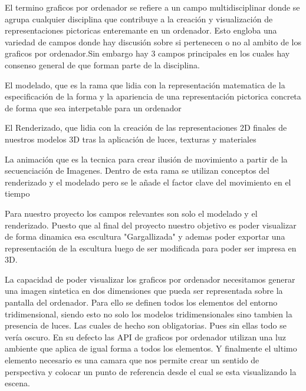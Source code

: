 El termino graficos por ordenador se refiere a un campo multidisciplinar donde se agrupa cualquier disciplina que contribuye a la creación y visualización de representaciones pictoricas enteremante en un ordenador\cite{Foley_1995}.
Esto engloba una variedad de campos donde hay discusión sobre si pertenecen o no al ambito de los graficos por ordenador.Sin embargo hay 3 campos principales en los cuales hay consenso general de que forman parte de la disciplina.
\begin{list}{.}{}
    \item El modelado, que es la rama que lidia con la representación matematica de la especificación de la forma y la apariencia de una representación pictorica concreta de forma que sea interpetable para un ordenador
    \item El Renderizado, que lidia con la creación de las representaciones 2D finales de nuestros modelos 3D tras la aplicación de luces, texturas y materiales 
    \item La animación que es la tecnica para crear ilusión de movimiento a partir de la secuenciación de Imagenes. Dentro de esta rama se utilizan conceptos del renderizado y el modelado pero se le añade el factor clave del movimiento en el tiempo
\end{list} \cite{marschner_fundamentals_2018}

Para nuestro proyecto los campos relevantes son solo el modelado y el renderizado. Puesto que al final del proyecto nuestro objetivo es poder visualizar de forma dinamica esa escultura "Gargallizada" y ademas poder exportar una representación de la escultura luego de ser modificada para poder ser impresa en 3D.

La capacidad de poder visualizar los graficos por ordenador necesitamos generar una imagen sintetica en dos dimensiones que pueda ser representada sobre la pantalla del ordenador. Para ello se definen todos los elementos del entorno tridimensional, siendo esto no solo los modelos tridimensionales sino tambien la presencia de luces. Las cuales de hecho son obligatorias. Pues sin ellas todo se vería oscuro. 
En su defecto las API de graficos por ordenador utilizan una luz ambiente que aplica de igual forma a todos los elementos. Y finalmente el ultimo elemento necesario es una camara que nos permite crear un sentido de perspectiva y colocar un punto de referencia desde el cual se esta visualizando la escena.

